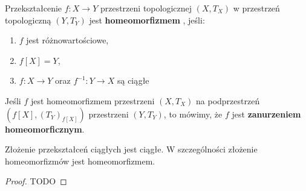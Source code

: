 \begin{definition}[1.3.6 Homeomorfizm]
	Przekształcenie $f: X \to Y$ przestrzeni topologicznej $\left( X, T_{X} \right) $ w przestrzeń topologiczną $\left( Y,T_{Y} \right) $ jest \textbf{homeomorfizmem} , jeśli:
	\begin{enumerate}[label=\arabic*)]
		\item $f$ jest różnowartościowe,
		\item $f\left[ X \right] = Y$,
		\item $f : X \to Y$ oraz $f^{-1}: Y \to X$ są ciągłe
	\end{enumerate}

	Jeśli $f$ jest homeomorfizmem przestrzeni $\left( X,T_{X} \right) $ na podprzestrzeń $\left( f\left[ X \right], \left( T_{Y} \right)_{f\left[ X \right] } \right) $ przestrzeni $\left( Y, T_{Y} \right) $, to mówimy, że $f$ jest \textbf{zanurzeniem homeomorficznym}.
\end{definition} 

\begin{remark}[1.3.7]
	Złożenie przekształceń ciągłych jest ciągłe. W szczególności złożenie homeomorfizmów jest homeomorfizmem.
	
\end{remark} 
\begin{proof}
	TODO
\end{proof} 

